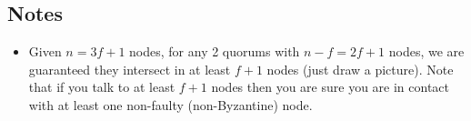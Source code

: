 \documentclass[10pt,a4paper]{article}
\begin{document}
\subsection*{Notes}
\begin{itemize}
    \item Given $n=3f+1$ nodes, for any 2 quorums with $n-f = 2f+1$ nodes, we are guaranteed they intersect in at least $f+1$ nodes (just draw a picture). Note that if you talk to at least $f+1$ nodes then you are sure you are in contact with at least one non-faulty (non-Byzantine) node.
\end{itemize}




\end{document}
